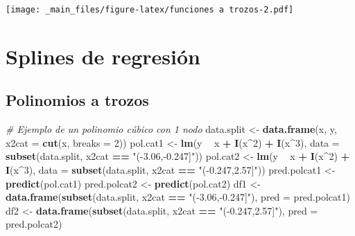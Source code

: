 \documentclass[
]{book}
\newenvironment{Shaded}{\begin{snugshade}}{\end{snugshade}}
\newcommand{\CommentTok}[1]{\textcolor[rgb]{0.56,0.35,0.01}{\textit{#1}}}
\newcommand{\DataTypeTok}[1]{\textcolor[rgb]{0.13,0.29,0.53}{#1}}
\newcommand{\DecValTok}[1]{\textcolor[rgb]{0.00,0.00,0.81}{#1}}
\newcommand{\KeywordTok}[1]{\textcolor[rgb]{0.13,0.29,0.53}{\textbf{#1}}}
\newcommand{\NormalTok}[1]{#1}
\newcommand{\OperatorTok}[1]{\textcolor[rgb]{0.81,0.36,0.00}{\textbf{#1}}}
\newcommand{\StringTok}[1]{\textcolor[rgb]{0.31,0.60,0.02}{#1}}
\begin{document}
\texttt{[image: \_main\_files/figure-latex/funciones a trozos-2.pdf]}

\hypertarget{splines-de-regresiuxf3n}{%
\section{Splines de regresión}\label{splines-de-regresiuxf3n}}

\hypertarget{polinomios-a-trozos}{%
\subsection{Polinomios a trozos}\label{polinomios-a-trozos}}

\begin{Shaded}
\begin{Highlighting}[]
\CommentTok{# Ejemplo de un polinomio cúbico con 1 nodo}
\NormalTok{data.split <-}\StringTok{ }\KeywordTok{data.frame}\NormalTok{(x, y, }\DataTypeTok{x2cat =} \KeywordTok{cut}\NormalTok{(x, }\DataTypeTok{breaks =} \DecValTok{2}\NormalTok{))}
\NormalTok{pol.cat1 <-}\StringTok{ }\KeywordTok{lm}\NormalTok{(y }\OperatorTok{~}\StringTok{ }\NormalTok{x }\OperatorTok{+}\StringTok{ }\KeywordTok{I}\NormalTok{(x}\OperatorTok{^}\DecValTok{2}\NormalTok{) }\OperatorTok{+}\StringTok{ }\KeywordTok{I}\NormalTok{(x}\OperatorTok{^}\DecValTok{3}\NormalTok{), }\DataTypeTok{data =} \KeywordTok{subset}\NormalTok{(data.split, x2cat }\OperatorTok{==}\StringTok{ "(-3.06,-0.247]"}\NormalTok{))}
\NormalTok{pol.cat2 <-}\StringTok{ }\KeywordTok{lm}\NormalTok{(y }\OperatorTok{~}\StringTok{ }\NormalTok{x }\OperatorTok{+}\StringTok{ }\KeywordTok{I}\NormalTok{(x}\OperatorTok{^}\DecValTok{2}\NormalTok{) }\OperatorTok{+}\StringTok{ }\KeywordTok{I}\NormalTok{(x}\OperatorTok{^}\DecValTok{3}\NormalTok{), }\DataTypeTok{data =} \KeywordTok{subset}\NormalTok{(data.split, x2cat }\OperatorTok{==}\StringTok{ "(-0.247,2.57]"}\NormalTok{))}
\NormalTok{pred.polcat1 <-}\StringTok{ }\KeywordTok{predict}\NormalTok{(pol.cat1)}
\NormalTok{pred.polcat2 <-}\StringTok{ }\KeywordTok{predict}\NormalTok{(pol.cat2)}
\NormalTok{df1 <-}\StringTok{ }\KeywordTok{data.frame}\NormalTok{(}\KeywordTok{subset}\NormalTok{(data.split, x2cat }\OperatorTok{==}\StringTok{ "(-3.06,-0.247]"}\NormalTok{), }\DataTypeTok{pred =}\NormalTok{ pred.polcat1)}
\NormalTok{df2 <-}\StringTok{ }\KeywordTok{data.frame}\NormalTok{(}\KeywordTok{subset}\NormalTok{(data.split, x2cat }\OperatorTok{==}\StringTok{ "(-0.247,2.57]"}\NormalTok{), }\DataTypeTok{pred =}\NormalTok{ pred.polcat2)}


\end{Highlighting}
\end{Shaded}
\end{document}
